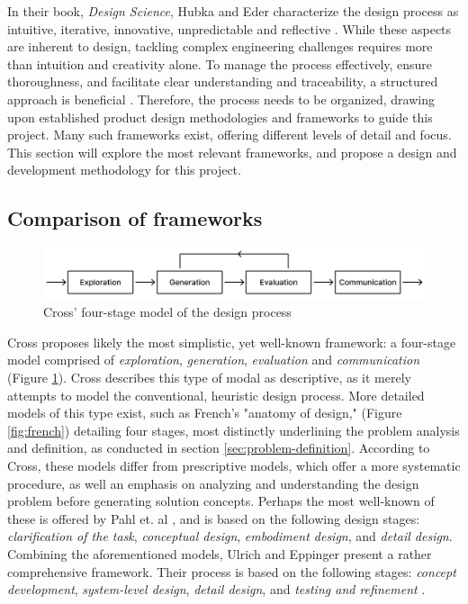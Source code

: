 In their book, \textit{Design Science}, Hubka and Eder characterize the design process as intuitive, iterative, innovative, unpredictable and reflective \cite{hubka_eder}. While these aspects are inherent to design, tackling complex engineering challenges requires more than intuition and creativity alone. To manage the process effectively, ensure thoroughness, and facilitate clear understanding and traceability, a structured approach is beneficial \cite{eder}. Therefore, the process needs to be organized, drawing upon established product design methodologies and frameworks to guide this project. Many such frameworks exist, offering different levels of detail and focus. This section will explore the most relevant frameworks, and propose a design and development methodology for this project.

\subsection{Comparison of frameworks}
\vspace{2em}
\begin{figure}[H]
  \centering
  \includegraphics[width=\textwidth]{Pictures/Figures/cross.png}
  \caption{Cross' four-stage model of the design process}
  \label{fig:cross}
\end{figure}

Cross \cite{cross} proposes likely the most simplistic, yet well-known framework: a four-stage model comprised of \textit{exploration}, \textit{generation}, \textit{evaluation} and \textit{communication} (Figure \ref{fig:cross}). Cross describes this type of modal as descriptive, as it merely attempts to model the conventional, heuristic design process. More detailed models of this type exist, such as French's \cite{french} "anatomy of design," (Figure \ref{fig:french}) detailing four stages, most distinctly underlining the problem analysis and definition, as conducted in section \ref{sec:problem-definition}. According to Cross, these models differ from prescriptive models, which offer a more systematic procedure, as well an emphasis on analyzing and understanding the design problem before generating solution concepts. Perhaps the most well-known of these is offered by Pahl et. al \cite{pahl_beitz}, and is based on the following design stages: \textit{clarification of the task}, \textit{conceptual design}, \textit{embodiment design}, and \textit{detail design}. Combining the aforementioned models, Ulrich and Eppinger present a rather comprehensive framework. Their process is based on the following stages: \textit{concept development}, \textit{system-level design}, \textit{detail design}, and \textit{testing and refinement} \cite{ulrich_eppinger}.

